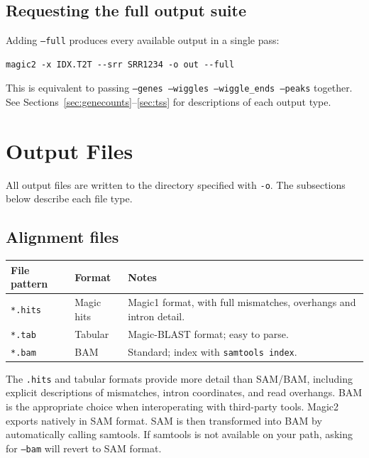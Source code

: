 \documentclass[11pt]{article}
\newcommand{\code}[1]{\texttt{#1}}
\begin{document}
\subsection{Requesting the full output suite}

Adding \code{--full} produces every available output in a single pass:
\begin{lstlisting}
magic2 -x IDX.T2T --srr SRR1234 -o out --full
\end{lstlisting}
This is equivalent to passing \code{--genes --wiggles --wiggle\_ends --peaks}
together.  See Sections~\ref{sec:genecounts}--\ref{sec:tss} for
descriptions of each output type.

\section{Output Files}

All output files are written to the directory specified with \code{-o}.
The subsections below describe each file type.

\subsection{Alignment files}

\begin{center}
\begin{tabular}{ll p{7.5cm}}
\toprule
\textbf{File pattern} & \textbf{Format} & \textbf{Notes} \\
\midrule
\code{*.hits}         & Magic hits      & Magic1 format, with full mismatches, overhangs and intron detail. \\
\code{*.tab}          & Tabular         & Magic-BLAST format; easy to parse. \\
\code{*.bam}          & BAM             & Standard; index with \code{samtools index}. \\
\bottomrule
\end{tabular}
\end{center}

The \code{.hits} and tabular formats provide more detail than SAM/BAM,
including explicit descriptions of mismatches, intron coordinates, and
read overhangs.  BAM is the appropriate choice when interoperating with
third-party tools.
Magic2 exports natively in SAM format. SAM is then transformed into BAM
by automatically calling samtools. If samtools is not available on your
path, asking for \code{--bam} will revert to SAM format.
\end{document}
